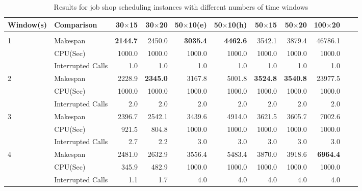 \documentclass[runningheads]{llncs}
\begin{document}
\begin{table}[t]
    \caption{Results for job shop scheduling instances with different numbers of time windows\label{tab:Table01}}%
    \centering
    \begin{tabular}{l l r r r r r r r r r}
    \hline
    Window(s) & Comparison & 30$\times$15 & 30$\times$20  & 50$\times$10(e) & 50$\times$10(h) & 50$\times$15 & 50$\times$20 & 100$\times$20 \\
                     
    \hline\\[-2.75mm]
    1                & Makespan             & \textbf{2144.7}	& 2450.0   & \textbf{3035.4}	     & \textbf{4462.6}	   & 3542.1	 & 3879.4  & 46786.1 \\
                     & CPU(Sec)             & 1000.0	& 1000.0   & 1000.0	     & 1000.0	   & 1000.0	 & 1000.0  & 1000.0 \\
                     & Interrupted Calls    & 1.0	    & 1.0      & 1.0	     & 1.0	       & 1.0	 & 1.0     & 1.0 \\[1.5mm]
                     
    2                & Makespan             & 2228.9	& \textbf{2345.0}   & 3167.8	     & 5001.8	   & \textbf{3524.8}	 & \textbf{3540.8}  & 23977.5 \\
                     & CPU(Sec)             & 1000.0	    & 1000.0	   & 1000.0	     & 1000.0	   & 1000.0	 & 1000.0  & 1000.0 \\
                     & Interrupted Calls    & 2.0	    & 2.0      & 2.0	     & 2.0	       & 2.0	 & 2.0     & 2.0 \\[1.5mm]
                     
    3                & Makespan             & 2396.7	& 2542.1   & 3439.6	     & 4914.0	   & 3621.5	 & 3605.7  & 7002.6 \\
                     & CPU(Sec)             & 921.5	    & 804.8    & 1000.0	     & 1000.0	   & 1000.0	 & 1000.0  & 1000.0 \\
                     & Interrupted Calls    & 2.7	    & 2.2      & 3.0	     & 3.0	       & 3.0	 & 3.0     & 3.0 \\[1.5mm]
                     
    4                & Makespan             & 2481.0	& 2632.9   & 3556.4	     & 5483.4	   & 3870.0	 & 3918.6  & \textbf{6964.4} \\
                     & CPU(Sec)             & 345.9	    & 482.9	   & 1000.0	     & 1000.0	   & 1000.0	 & 1000.0   & 1000.0 \\
                     & Interrupted Calls    & 1.1	    & 1.7      & 4.0	     & 4.0	       & 4.0	 & 4.0     & 4.0 \\[1.5mm]
                     

\end{tabular}
\end{table}
\end{document}
